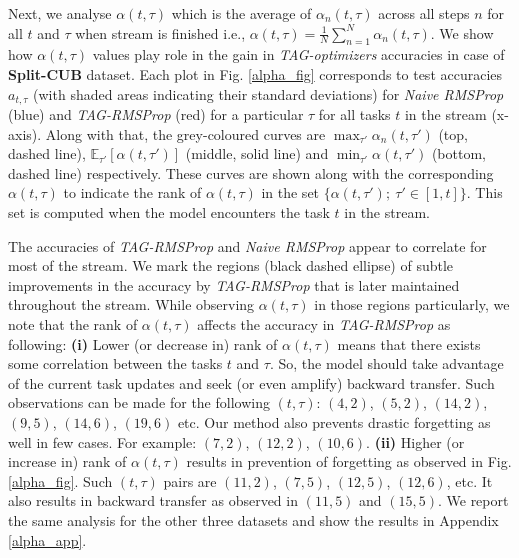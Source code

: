 \documentclass{article} \usepackage{collas2022_conference,times}
\begin{document}
    Next, we analyse $\alpha(t,\tau)$ which is the average of $\alpha_n(t,\tau)$ across all steps $n$ for all $t$ and $\tau$ when stream is finished i.e., $\alpha(t,\tau) = \frac{1}{N}\sum_{n=1}^N \alpha_n(t,\tau)$. We show how $\alpha(t,\tau)$ values play role in the gain in \textit{TAG-optimizers} accuracies in case of \textbf{Split-CUB} dataset. Each plot in Fig. \ref{alpha_fig} corresponds to test accuracies $a_{t,\tau}$ (with shaded areas indicating their standard deviations) for \textit{Naive RMSProp} (blue) and \textit{TAG-RMSProp} (red) for a particular $\tau$ for all tasks $t$ in the stream (x-axis). Along with that, the grey-coloured curves are $\max_{\tau'} \alpha_n(t,\tau')$ (top, dashed line), $\mathbb{E}_{\tau'} [\alpha(t,\tau')]$ (middle, solid line) and $\min_{\tau'} \alpha(t,\tau')$ (bottom, dashed line) respectively. { These curves are shown along with the corresponding $\alpha(t,\tau)$ to indicate the rank of $\alpha(t,\tau)$ in the set $\{\alpha(t,\tau');~ \tau'\in[1,t]\}$. This set is computed when the model encounters the task $t$ in the stream.}

    The accuracies of \textit{TAG-RMSProp} and \textit{Naive RMSProp} appear to correlate for most of the stream. We mark the regions (black dashed ellipse) of subtle improvements in the accuracy by \textit{TAG-RMSProp} that is later maintained throughout the stream. While observing $\alpha(t,\tau)$ in those regions particularly, we note that the rank of $\alpha(t,\tau)$ affects the accuracy in \textit{TAG-RMSProp} as following: \textbf{(i)} Lower (or decrease in) rank of $\alpha(t,\tau)$ means that there exists some correlation between the tasks $t$ and $\tau$. So, the model should take advantage of the current task updates and seek (or even amplify) backward transfer. Such observations can be made for the following $(t,\tau)$: $(4,2)$, $(5,2)$, $(14,2)$, $(9,5)$, $(14,6)$, $(19,6)$ etc. Our method also prevents drastic forgetting as well in few cases. For example: $(7, 2)$, $(12, 2)$, $(10,6)$. \textbf{(ii)} Higher (or increase in) rank of $\alpha(t,\tau)$ results in prevention of forgetting as observed in Fig. \ref{alpha_fig}. Such $(t,\tau)$ pairs are $(11,2)$, $(7,5)$, $(12,5)$, $(12,6)$, etc. It also results in backward transfer as observed in $(11,5)$ and $(15,5)$. We report the same analysis for the other three datasets and show the results in Appendix \ref{alpha_app}. 
\end{document}
